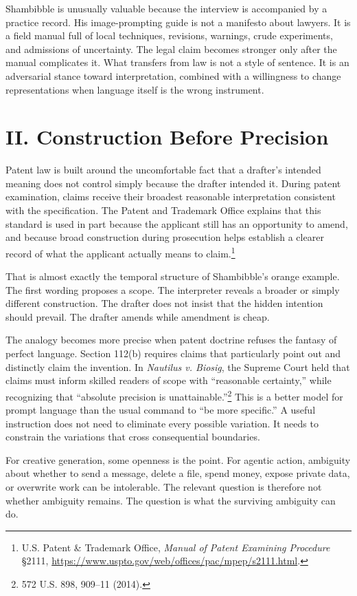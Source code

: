 \documentclass[11pt]{article}
\begin{document}
Shambibble is unusually valuable because the interview is accompanied by a practice record. His image-prompting guide is not a manifesto about lawyers. It is a field manual full of local techniques, revisions, warnings, crude experiments, and admissions of uncertainty. The legal claim becomes stronger only after the manual complicates it. What transfers from law is not a style of sentence. It is an adversarial stance toward interpretation, combined with a willingness to change representations when language itself is the wrong instrument.

\section*{II. Construction Before Precision}
Patent law is built around the uncomfortable fact that a drafter's intended meaning does not control simply because the drafter intended it. During patent examination, claims receive their broadest reasonable interpretation consistent with the specification. The Patent and Trademark Office explains that this standard is used in part because the applicant still has an opportunity to amend, and because broad construction during prosecution helps establish a clearer record of what the applicant actually means to claim.\footnote{U.S. Patent \& Trademark Office, \emph{Manual of Patent Examining Procedure} \S 2111, \url{https://www.uspto.gov/web/offices/pac/mpep/s2111.html}.}

That is almost exactly the temporal structure of Shambibble's orange example. The first wording proposes a scope. The interpreter reveals a broader or simply different construction. The drafter does not insist that the hidden intention should prevail. The drafter amends while amendment is cheap.

The analogy becomes more precise when patent doctrine refuses the fantasy of perfect language. Section 112(b) requires claims that particularly point out and distinctly claim the invention. In \emph{Nautilus v. Biosig}, the Supreme Court held that claims must inform skilled readers of scope with ``reasonable certainty,'' while recognizing that ``absolute precision is unattainable.''\footnote{572 U.S. 898, 909--11 (2014).} This is a better model for prompt language than the usual command to ``be more specific.'' A useful instruction does not need to eliminate every possible variation. It needs to constrain the variations that cross consequential boundaries.

For creative generation, some openness is the point. For agentic action, ambiguity about whether to send a message, delete a file, spend money, expose private data, or overwrite work can be intolerable. The relevant question is therefore not whether ambiguity remains. The question is what the surviving ambiguity can do.
\end{document}

